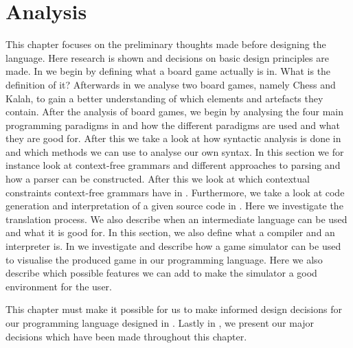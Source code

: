\chapter{Analysis}
\label{chap:analysis}

This chapter focuses on the preliminary thoughts made before designing
the language. Here research is shown and decisions on basic design
principles are made. In  we begin by
defining what a board game actually is in. What is the definition
of it? Afterwards in  we analyse two
board games, namely Chess and Kalah, to gain a better understanding
of which elements and artefacts they contain. After the analysis
of board games, we begin by analysing the four main programming
paradigms in  and how the different paradigms
are used and what they are good for. After this we take a look at
how syntactic analysis is done in 
and which methods we can use to analyse our own syntax. In this
section we for instance look at context-free grammars and different
approaches to parsing and how a parser can be constructed. After
this we look at which contextual constraints context-free grammars
have in . Furthermore, we take a
look at code generation and interpretation of a given source code in
. Here we investigate the
translation process. We also describe when an intermediate language can
be used and what it is good for. In this section, we also define what a
compiler and an interpreter is. In  we investigate
and describe how a game simulator can be used to visualise the produced
game in our programming language. Here we also describe which possible
features we can add to make the simulator a good environment for the
user.

This chapter must make it possible for us to make informed
design decisions for our programming language designed in
. Lastly in ,
we present our major decisions which have been made throughout this
chapter.










